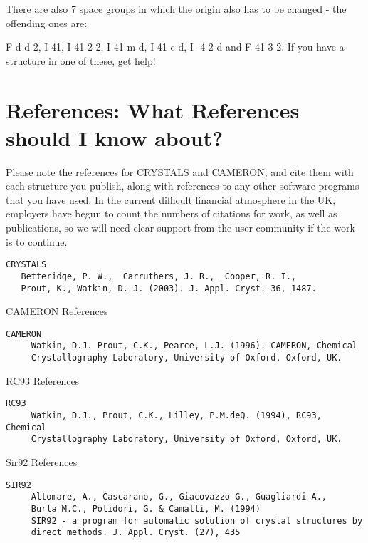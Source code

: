 \documentclass[10pt,a4paper]{report}
\begin{document}
There are also 7 space groups in which the origin also has to be changed - 
the offending ones are:


F d d 2, I 41, I 41 2 2, I 41 m d, I 41 c d, I -4 2 d and F 41 3 2. If you 
have a structure in one of these, get help!




\section{References: What References should I know about?}


Please note the references for CRYSTALS and CAMERON, and cite them with each
structure you publish, along with references to any other software programs that you
have used. In the current difficult financial
atmosphere in the UK, employers have begun to count the numbers of
citations for work, as well as publications, so we will need clear support from
the user community if the work is to continue.

\small\begin{verbatim}
CRYSTALS
   Betteridge, P. W.,  Carruthers, J. R.,  Cooper, R. I.,
   Prout, K., Watkin, D. J. (2003). J. Appl. Cryst. 36, 1487.
\end{verbatim}\normalsize




 CAMERON References
\small\begin{verbatim}
CAMERON
     Watkin, D.J. Prout, C.K., Pearce, L.J. (1996). CAMERON, Chemical
     Crystallography Laboratory, University of Oxford, Oxford, UK.
\end{verbatim}\normalsize




 RC93 References
\small\begin{verbatim}
RC93
     Watkin, D.J., Prout, C.K., Lilley, P.M.deQ. (1994), RC93, Chemical
     Crystallography Laboratory, University of Oxford, Oxford, UK.
\end{verbatim}\normalsize




 Sir92 References
\small\begin{verbatim}
SIR92
     Altomare, A., Cascarano, G., Giacovazzo G., Guagliardi A.,
     Burla M.C., Polidori, G. & Camalli, M. (1994)
     SIR92 - a program for automatic solution of crystal structures by
     direct methods. J. Appl. Cryst. (27), 435
\end{verbatim}\normalsize
\end{document}
